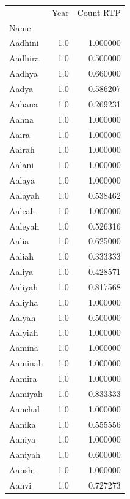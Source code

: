 \documentclass[
  letterpaper,
  DIV=11,
  numbers=noendperiod]{scrreprt}
\begin{document}
\begin{tabular}{lrr}
\toprule
{} &  Year &  Count RTP \\
Name            &       &            \\
\midrule
Aadhini         &   1.0 &   1.000000 \\
Aadhira         &   1.0 &   0.500000 \\
Aadhya          &   1.0 &   0.660000 \\
Aadya           &   1.0 &   0.586207 \\
Aahana          &   1.0 &   0.269231 \\
Aahna           &   1.0 &   1.000000 \\
Aaira           &   1.0 &   1.000000 \\
Aairah          &   1.0 &   1.000000 \\
Aalani          &   1.0 &   1.000000 \\
Aalaya          &   1.0 &   1.000000 \\
Aalayah         &   1.0 &   0.538462 \\
Aaleah          &   1.0 &   1.000000 \\
Aaleyah         &   1.0 &   0.526316 \\
Aalia           &   1.0 &   0.625000 \\
Aaliah          &   1.0 &   0.333333 \\
Aaliya          &   1.0 &   0.428571 \\
Aaliyah         &   1.0 &   0.817568 \\
Aaliyha         &   1.0 &   1.000000 \\
Aalyah          &   1.0 &   0.500000 \\
Aalyiah         &   1.0 &   1.000000 \\
Aamina          &   1.0 &   1.000000 \\
Aaminah         &   1.0 &   1.000000 \\
Aamira          &   1.0 &   1.000000 \\
Aamiyah         &   1.0 &   0.833333 \\
Aanchal         &   1.0 &   1.000000 \\
Aanika          &   1.0 &   0.555556 \\
Aaniya          &   1.0 &   1.000000 \\
Aaniyah         &   1.0 &   0.600000 \\
Aanshi          &   1.0 &   1.000000 \\
Aanvi           &   1.0 &   0.727273 \\

\end{tabular}
\end{document}
